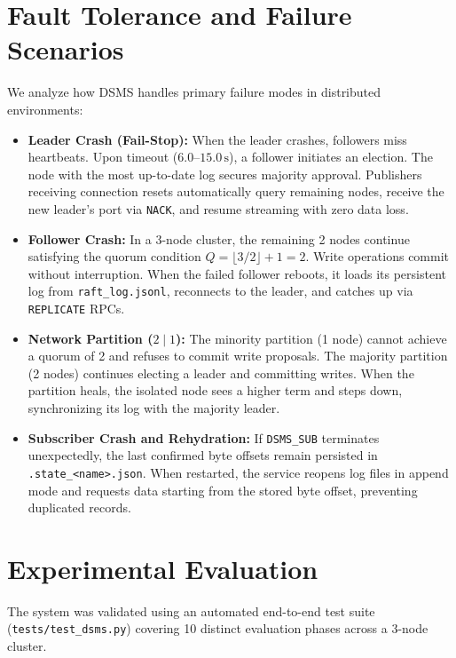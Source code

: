 \documentclass[11pt,a4paper]{article}
\begin{document}
\section{Fault Tolerance and Failure Scenarios}
\label{sec:fault_tolerance}
We analyze how DSMS handles primary failure modes in distributed environments:

\begin{itemize}[leftmargin=*]
    \item \textbf{Leader Crash (Fail-Stop):}
    When the leader crashes, followers miss heartbeats. Upon timeout ($6.0\text{--}15.0\,\text{s}$), a follower initiates an election. The node with the most up-to-date log secures majority approval. Publishers receiving connection resets automatically query remaining nodes, receive the new leader's port via \texttt{NACK}, and resume streaming with zero data loss.
    
    \item \textbf{Follower Crash:}
    In a 3-node cluster, the remaining 2 nodes continue satisfying the quorum condition $Q = \lfloor 3/2 \rfloor + 1 = 2$. Write operations commit without interruption. When the failed follower reboots, it loads its persistent log from \texttt{raft\_log.jsonl}, reconnects to the leader, and catches up via \texttt{REPLICATE} RPCs.
    
    \item \textbf{Network Partition ($2 \mid 1$):}
    The minority partition (1 node) cannot achieve a quorum of 2 and refuses to commit write proposals. The majority partition (2 nodes) continues electing a leader and committing writes. When the partition heals, the isolated node sees a higher term and steps down, synchronizing its log with the majority leader.
    
    \item \textbf{Subscriber Crash and Rehydration:}
    If \texttt{DSMS\_SUB} terminates unexpectedly, the last confirmed byte offsets remain persisted in \texttt{.state\_<name>.json}. When restarted, the service reopens log files in append mode and requests data starting from the stored byte offset, preventing duplicated records.
\end{itemize}

\section{Experimental Evaluation}
\label{sec:evaluation}
The system was validated using an automated end-to-end test suite (\texttt{tests/test\_dsms.py}) covering 10 distinct evaluation phases across a 3-node cluster.
\end{document}
